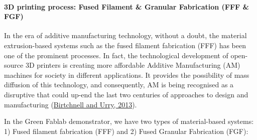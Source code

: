 \documentclass[
  11pt,
]{article}
\let\oldparagraph\paragraph
\renewcommand{\paragraph}[1]{\oldparagraph{#1}\mbox{}}
\let\paragraph\oldparagraph
\begin{document}
\hypertarget{d-printing-process-fused-filament-granular-fabrication-fff-fgf}{%
\paragraph{3D printing process: Fused Filament \& Granular Fabrication
(FFF \&
FGF)}\label{d-printing-process-fused-filament-granular-fabrication-fff-fgf}}

In the era of additive manufacturing technology, without a doubt, the
material extrusion-based systems such as the fused filament fabrication
(FFF) has been one of the prominent processes. In fact, the
technological development of open-source 3D printers is creating more
affordable Additive Manufacturing (AM) machines for society in different
applications. It provides the possibility of mass diffusion of this
technology, and consequently, AM is being recognised as a disruptive
that could up-end the last two centuries of approaches to design and
manufacturing (\protect\hyperlink{ref-Birtchnell2013a}{Birtchnell and
Urry, 2013}).

In the Green Fablab demonstrator, we have two types of material-based
systems: 1) Fused filament fabrication (FFF) and 2) Fused Granular
Fabrication (FGF):
\end{document}
